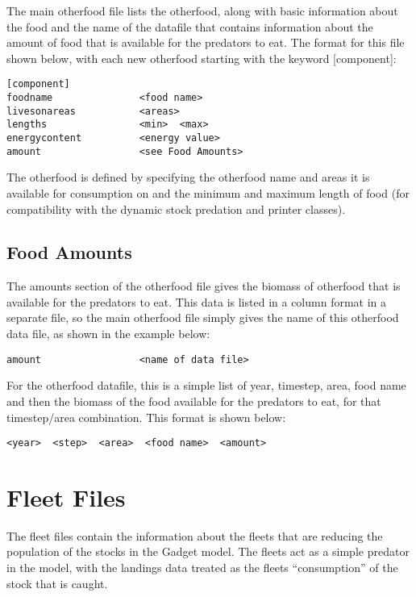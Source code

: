 \documentclass[]{book}
\begin{document}
The main otherfood file lists the otherfood, along with basic
information about the food and the name of the datafile that contains
information about the amount of food that is available for the predators
to eat. The format for this file shown below, with each new otherfood
starting with the keyword {[}component{]}:

\begin{verbatim}
[component]
foodname               <food name>
livesonareas           <areas>
lengths                <min>  <max>
energycontent          <energy value>
amount                 <see Food Amounts>
\end{verbatim}

The otherfood is defined by specifying the otherfood name and areas it
is available for consumption on and the minimum and maximum length of
food (for compatibility with the dynamic stock predation and printer
classes).

\hypertarget{sec:foodamounts}{%
\section{Food Amounts}\label{sec:foodamounts}}

The amounts section of the otherfood file gives the biomass of otherfood
that is available for the predators to eat. This data is listed in a
column format in a separate file, so the main otherfood file simply
gives the name of this otherfood data file, as shown in the example
below:

\begin{verbatim}
amount                 <name of data file>
\end{verbatim}

For the otherfood datafile, this is a simple list of year, timestep,
area, food name and then the biomass of the food available for the
predators to eat, for that timestep/area combination. This format is
shown below:

\begin{verbatim}
<year>  <step>  <area>  <food name>  <amount>
\end{verbatim}

\hypertarget{chap:fleet}{%
\chapter{Fleet Files}\label{chap:fleet}}

The fleet files contain the information about the fleets that are
reducing the population of the stocks in the Gadget model. The fleets
act as a simple predator in the model, with the landings data treated as
the fleets ``consumption'' of the stock that is caught.
\end{document}
